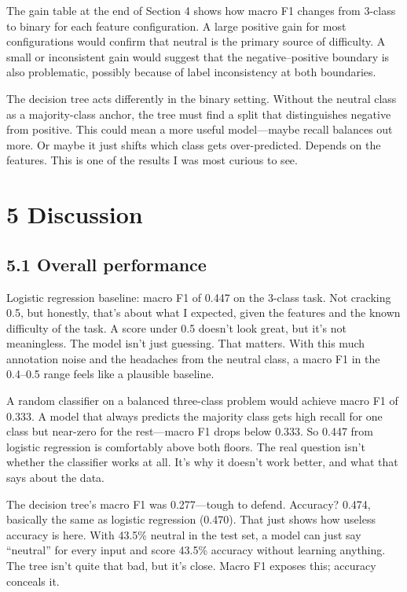 \documentclass[12pt]{article}
\begin{document}
The gain table at the end of Section 4 shows how macro F1 changes from 3-class to binary for each feature configuration. A large positive gain for most configurations would confirm that neutral is the primary source of difficulty. A small or inconsistent gain would suggest that the negative--positive boundary is also problematic, possibly because of label inconsistency at both boundaries.

The decision tree acts differently in the binary setting. Without the neutral class as a majority-class anchor, the tree must find a split that distinguishes negative from positive. This could mean a more useful model---maybe recall balances out more. Or maybe it just shifts which class gets over-predicted. Depends on the features. This is one of the results I was most curious to see.



\section*{5 Discussion}



\subsection*{5.1 Overall performance}



Logistic regression baseline: macro F1 of 0.447 on the 3-class task. Not cracking 0.5, but honestly, that's about what I expected, given the features and the known difficulty of the task. A score under 0.5 doesn't look great, but it's not meaningless. The model isn't just guessing. That matters. With this much annotation noise and the headaches from the neutral class, a macro F1 in the 0.4--0.5 range feels like a plausible baseline.

A random classifier on a balanced three-class problem would achieve macro F1 of 0.333. A model that always predicts the majority class gets high recall for one class but near-zero for the rest---macro F1 drops below 0.333. So 0.447 from logistic regression is comfortably above both floors. The real question isn't whether the classifier works at all. It's why it doesn't work better, and what that says about the data.

The decision tree's macro F1 was 0.277---tough to defend. Accuracy? 0.474, basically the same as logistic regression (0.470). That just shows how useless accuracy is here. With 43.5\% neutral in the test set, a model can just say ``neutral'' for every input and score 43.5\% accuracy without learning anything. The tree isn't quite that bad, but it's close. Macro F1 exposes this; accuracy conceals it.
\end{document}
